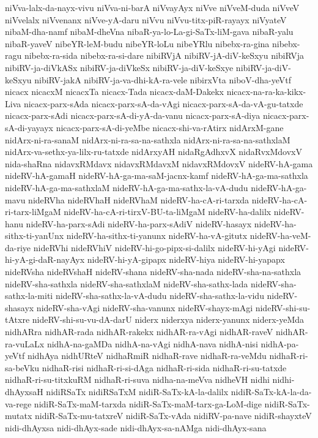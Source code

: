 {niVva-lalx-da-nayx-vivu
niVva-ni-barA
niVvayAyx
niVve
niVveM-duda
niVveV
niVvelalx
niVvenanx
niVve-yA-daru
niVvu
niVvu-titx-piR-rayayx
niVyateV
nibaM-dha-namf
nibaM-dheVna
nibaR-ya-lo-La-gi-SaTx-liM-gava
nibaR-yalu
nibaR-yaveV
nibeYR-leM-budu
nibeYR-loLu
nibeYRlu
nibebx-ra-gina
nibebx-ragu
nibebx-ra-sida
nibebx-ra-si-dare
nibiRVjA
nibiRV-jA-diV-keSxyu
nibiRVja
nibiRV-ja-diVkASx
nibiRV-ja-diVkeSx
nibiRV-ja-diV-keSxye
nibiRV-ja-diV-keSxyu
nibiRV-jakA
nibiRV-ja-va-dhi-kA-ra-vele
nibirxVta
niboV-dha-yeVtf
nicacx
nicacxM
nicacxTa
nicacx-Tada
nicacx-daM-Dakekx
nicacx-na-ra-ka-kikx-Liva
nicacx-parx-sAda
nicacx-parx-sA-da-vAgi
nicacx-parx-sA-da-vA-gu-tatxde
nicacx-parx-sAdi
nicacx-parx-sA-di-yA-da-vanu
nicacx-parx-sA-diya
nicacx-parx-sA-di-yayayx
nicacx-parx-sA-di-yeMbe
nicacx-shi-va-rAtirx
nidArxM-gane
nidArx-ni-ra-sanaM
nidArx-ni-ra-sa-na-sathxla
nidArx-ni-ra-sa-na-sathxlaM
nidArx-va-sethx-ya-lilx-ru-tatxde
nidArxyAH
nidaRgAdhxvX
nidaRvxMdovxV
nida-shaRna
nidavxRMdavx
nidavxRMdavxM
nidavxRMdovxV
nideRV-hA-gama
nideRV-hA-gamaH
nideRV-hA-ga-ma-saM-jacnx-kamf
nideRV-hA-ga-ma-sathxla
nideRV-hA-ga-ma-sathxlaM
nideRV-hA-ga-ma-sathx-la-vA-dudu
nideRV-hA-ga-mavu
nideRVha
nideRVhaH
nideRVhaM
nideRV-ha-cA-ri-tarxda
nideRV-ha-cA-ri-tarx-liMgaM
nideRV-ha-cA-ri-tirxV-BU-ta-liMgaM
nideRV-ha-dalilx
nideRV-hanu
nideRV-ha-parx-sAdi
nideRV-ha-parx-sAdiV
nideRV-hasayx
nideRV-ha-sithx-ti-yanUnx
nideRV-ha-sithx-ti-yanunx
nideRV-ha-vA-gitutx
nideRV-ha-veM-da-riye
nideRVhi
nideRVhiV
nideRV-hi-go-pipx-si-dalilx
nideRV-hi-yAgi
nideRV-hi-yA-gi-daR-nayAyx
nideRV-hi-yA-gipapx
nideRV-hiya
nideRV-hi-yapapx
nideRVsha
nideRVshaH
nideRV-shana
nideRV-sha-nada
nideRV-sha-na-sathxla
nideRV-sha-sathxla
nideRV-sha-sathxlaM
nideRV-sha-sathx-lada
nideRV-sha-sathx-la-miti
nideRV-sha-sathx-la-vA-dudu
nideRV-sha-sathx-la-vidu
nideRV-shasayx
nideRV-sha-vAgi
nideRV-sha-vanunx
nideRV-shayx-mAgi
nideRV-shi-su-tAtxre
nideRV-shi-su-vu-dA-darU
niderx
niderxya
niderx-yanunx
niderx-yeMda
nidhARra
nidhAR-rada
nidhAR-rakekx
nidhAR-ra-vAgi
nidhAR-raveV
nidhAR-ra-vuLaLx
nidhA-na-gaMDa
nidhA-na-vAgi
nidhA-nava
nidhA-nisi
nidhA-pa-yeVtf
nidhAya
nidhURteV
nidhaRmiR
nidhaR-rave
nidhaR-ra-veMdu
nidhaR-ri-sa-beVku
nidhaR-risi
nidhaR-ri-si-dAga
nidhaR-ri-sida
nidhaR-ri-su-tatxde
nidhaR-ri-su-titxkuRM
nidhaR-ri-suva
nidha-na-meVva
nidheVH
nidhi
nidhi-dhAyxsaH
nidiRSaTx
nidiRSaTxM
nidiR-SaTx-kA-la-dalilx
nidiR-SaTx-kA-la-da-va-rege
nidiR-SaTx-maM-tarxda
nidiR-SaTx-maM-tarx-ga-LoM-dige
nidiR-SaTx-mutatx
nidiR-SaTx-mu-tatxreV
nidiR-SaTx-vAda
nidiRV-pa-nave
nidiR-shayxteV
nidi-dhAyxsa
nidi-dhAyx-sade
nidi-dhAyx-sa-nAMga
nidi-dhAyx-sana
}

